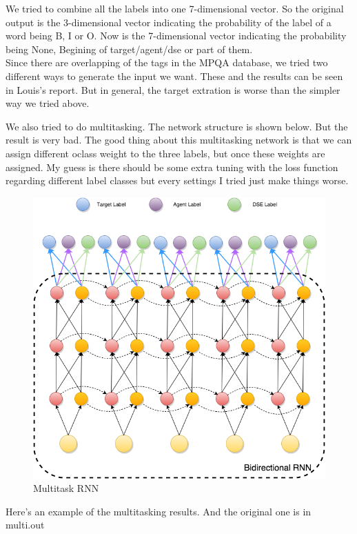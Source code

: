 \documentclass[fontsize=11pt, %
                             paper=a4, %
                             twoside, %
                             captions=tableheading,
                             index=totoc,
                             hyperref]{labbook}
\begin{document}
\begin{addmargin}[4cm]{0cm}

We tried to combine all the labels into one 7-dimensional vector. So the original output is the 3-dimensional vector indicating the probability of the label of a word being B, I or O. Now is the 7-dimensional vector indicating the probability being None, Begining of target/agent/dse or part of them.\\
Since there are overlapping of the tags in the MPQA database, we tried two different ways to generate the input we want. These and the results can be seen in Louis's report. But in general, the target extration is worse than the simpler way we tried above.


We also tried to do multitasking. The network structure is shown below. But the result is very bad. The good thing about this multitasking network is that we can assign different oclass weight to the three labels, but once these weights are assigned. My guess is there should be some extra tuning with the loss function regarding different label classes but every settings I tried just make things worse. 
\begin{figure}[h!]
\raggedleft
\includegraphics[scale=0.5,keepaspectratio=true]{multitaskRNN.png}
\caption{Multitask RNN}
\label{fig:multi}
\end{figure}
Here's an example of the multitasking results. And the original one is in multi.out

\end{addmargin}
\end{document}
